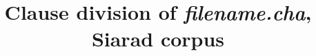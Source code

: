 \documentclass[a4paper, openany, oneside]{memoir}
\begin{document}
\title{Clause division of \textit{filename.cha}, Siarad corpus}
\author{}
\date{}

\maketitle
\end{document}
